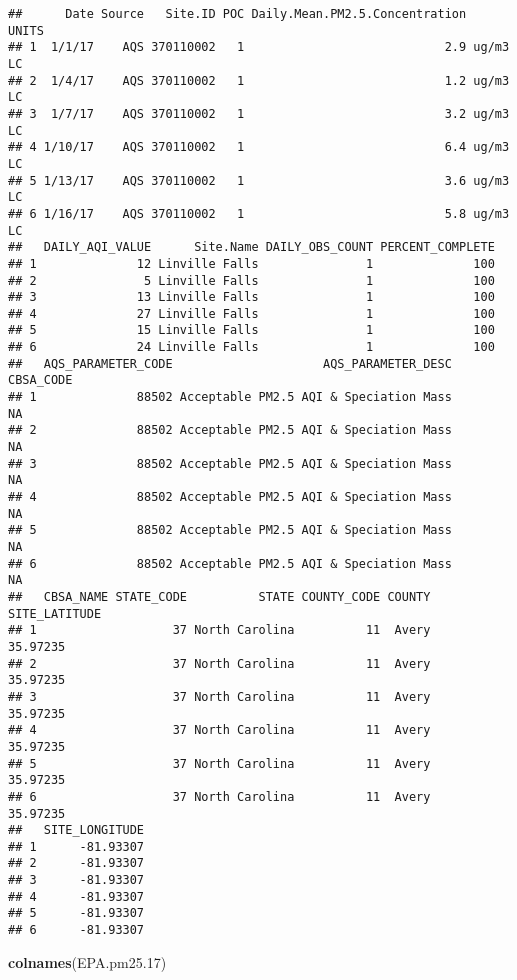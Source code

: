 \documentclass[]{article}
\newenvironment{Shaded}{\begin{snugshade}}{\end{snugshade}}
\newcommand{\KeywordTok}[1]{\textcolor[rgb]{0.13,0.29,0.53}{\textbf{#1}}}
\newcommand{\DecValTok}[1]{\textcolor[rgb]{0.00,0.00,0.81}{#1}}
\newcommand{\NormalTok}[1]{#1}
\begin{document}
\begin{verbatim}
##      Date Source   Site.ID POC Daily.Mean.PM2.5.Concentration    UNITS
## 1  1/1/17    AQS 370110002   1                            2.9 ug/m3 LC
## 2  1/4/17    AQS 370110002   1                            1.2 ug/m3 LC
## 3  1/7/17    AQS 370110002   1                            3.2 ug/m3 LC
## 4 1/10/17    AQS 370110002   1                            6.4 ug/m3 LC
## 5 1/13/17    AQS 370110002   1                            3.6 ug/m3 LC
## 6 1/16/17    AQS 370110002   1                            5.8 ug/m3 LC
##   DAILY_AQI_VALUE      Site.Name DAILY_OBS_COUNT PERCENT_COMPLETE
## 1              12 Linville Falls               1              100
## 2               5 Linville Falls               1              100
## 3              13 Linville Falls               1              100
## 4              27 Linville Falls               1              100
## 5              15 Linville Falls               1              100
## 6              24 Linville Falls               1              100
##   AQS_PARAMETER_CODE                     AQS_PARAMETER_DESC CBSA_CODE
## 1              88502 Acceptable PM2.5 AQI & Speciation Mass        NA
## 2              88502 Acceptable PM2.5 AQI & Speciation Mass        NA
## 3              88502 Acceptable PM2.5 AQI & Speciation Mass        NA
## 4              88502 Acceptable PM2.5 AQI & Speciation Mass        NA
## 5              88502 Acceptable PM2.5 AQI & Speciation Mass        NA
## 6              88502 Acceptable PM2.5 AQI & Speciation Mass        NA
##   CBSA_NAME STATE_CODE          STATE COUNTY_CODE COUNTY SITE_LATITUDE
## 1                   37 North Carolina          11  Avery      35.97235
## 2                   37 North Carolina          11  Avery      35.97235
## 3                   37 North Carolina          11  Avery      35.97235
## 4                   37 North Carolina          11  Avery      35.97235
## 5                   37 North Carolina          11  Avery      35.97235
## 6                   37 North Carolina          11  Avery      35.97235
##   SITE_LONGITUDE
## 1      -81.93307
## 2      -81.93307
## 3      -81.93307
## 4      -81.93307
## 5      -81.93307
## 6      -81.93307
\end{verbatim}

\begin{Shaded}
\begin{Highlighting}[]
\KeywordTok{colnames}\NormalTok{(EPA.pm25.}\DecValTok{17}\NormalTok{)}
\end{Highlighting}
\end{Shaded}
\end{document}
